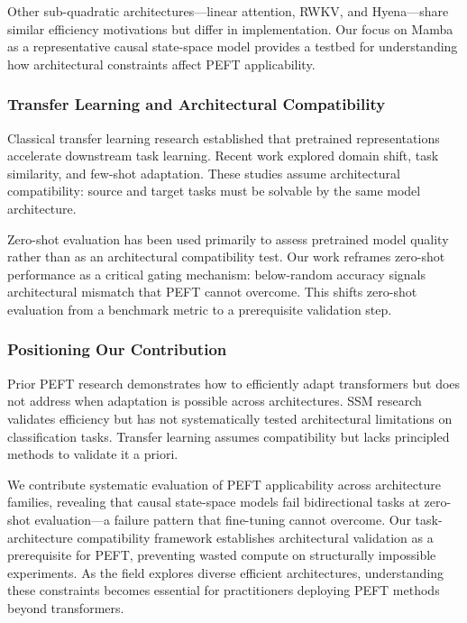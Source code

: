 Other sub-quadratic architectures---linear attention, RWKV, and Hyena---share similar efficiency motivations but differ in implementation. Our focus on Mamba as a representative causal state-space model provides a testbed for understanding how architectural constraints affect PEFT applicability.

\subsubsection{Transfer Learning and Architectural Compatibility}

Classical transfer learning research established that pretrained representations accelerate downstream task learning. Recent work explored domain shift, task similarity, and few-shot adaptation. These studies assume architectural compatibility: source and target tasks must be solvable by the same model architecture.

Zero-shot evaluation has been used primarily to assess pretrained model quality rather than as an architectural compatibility test. Our work reframes zero-shot performance as a critical gating mechanism: below-random accuracy signals architectural mismatch that PEFT cannot overcome. This shifts zero-shot evaluation from a benchmark metric to a prerequisite validation step.

\subsubsection{Positioning Our Contribution}

Prior PEFT research demonstrates how to efficiently adapt transformers but does not address when adaptation is possible across architectures. SSM research validates efficiency but has not systematically tested architectural limitations on classification tasks. Transfer learning assumes compatibility but lacks principled methods to validate it a priori.

We contribute systematic evaluation of PEFT applicability across architecture families, revealing that causal state-space models fail bidirectional tasks at zero-shot evaluation---a failure pattern that fine-tuning cannot overcome. Our task-architecture compatibility framework establishes architectural validation as a prerequisite for PEFT, preventing wasted compute on structurally impossible experiments. As the field explores diverse efficient architectures, understanding these constraints becomes essential for practitioners deploying PEFT methods beyond transformers.
